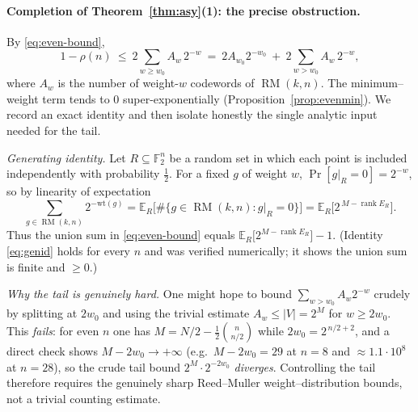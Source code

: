 \documentclass{amsart}
\theoremstyle{definition}
\DeclareMathOperator{\RM}{RM}
\DeclareMathOperator{\rank}{rank}
\newcommand{\F}{\mathbb{F}}
\begin{document}
\paragraph{Completion of Theorem~\ref{thm:asy}(1): the precise obstruction.}
By \eqref{eq:even-bound},
\begin{equation}\label{eq:tailsplit}
1-\rho(n)\ \le\ 2\sum_{w\ge w_0}A_w\,2^{-w}
\ =\ 2A_{w_0}2^{-w_0}\ +\ 2\sum_{w>w_0}A_w\,2^{-w},
\end{equation}
where $A_w$ is the number of weight-$w$ codewords of $\RM(k,n)$. The
minimum--weight term tends to $0$ super-exponentially
(Proposition~\ref{prop:evenmin}). We record an exact identity and then
isolate honestly the single analytic input needed for the tail.

\emph{Generating identity.} Let $R\subseteq\F_2^n$ be a random set in which
each point is included independently with probability $\tfrac12$. For a
fixed $g$ of weight $w$, $\Pr[g|_R=0]=2^{-w}$, so by linearity of
expectation
\begin{equation}\label{eq:genid}
\sum_{g\in\RM(k,n)}2^{-\mathrm{wt}(g)}
=\mathbb E_R\bigl[\#\{g\in\RM(k,n):g|_R=0\}\bigr]
=\mathbb E_R\bigl[2^{\,M-\rank E_R}\bigr].
\end{equation}
Thus the union sum in \eqref{eq:even-bound} equals
$\mathbb E_R\bigl[2^{M-\rank E_R}\bigr]-1$. (Identity \eqref{eq:genid}
holds for every $n$ and was verified numerically; it shows the union sum
is finite and $\ge0$.)

\emph{Why the tail is genuinely hard.} One might hope to bound
$\sum_{w>w_0}A_w2^{-w}$ crudely by splitting at $2w_0$ and using the
trivial estimate $A_w\le|V|=2^{M}$ for $w\ge 2w_0$. This \emph{fails}: for
even $n$ one has $M=N/2-\tfrac12\binom n{n/2}$ while $2w_0=2^{\,n/2+2}$,
and a direct check shows $M-2w_0\to+\infty$ (e.g.\ $M-2w_0=29$ at $n=8$
and $\approx1.1\cdot10^{8}$ at $n=28$), so the crude tail bound
$2^{M}\cdot2^{-2w_0}$ \emph{diverges}. Controlling the tail therefore
requires the genuinely sharp Reed--Muller weight--distribution bounds, not
a trivial counting estimate.
\end{document}
